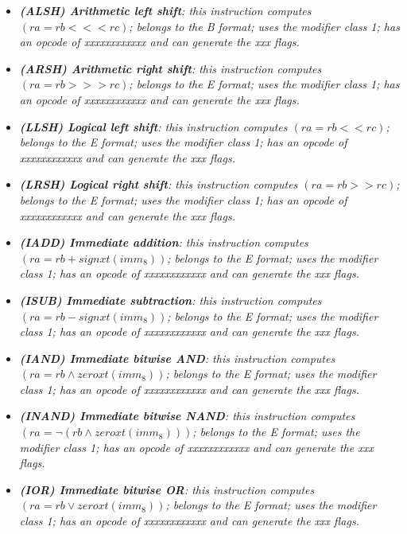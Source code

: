 \begin{multicols}{2}
\begin{itemize}
                \item \textit{\textbf{(ALSH) Arithmetic left shift}: this instruction computes \((ra = rb <<< rc)\); belongs to the B format; uses the modifier class 1; has an opcode of xxxxxxxxxxxx and can generate the xxx flags.}

                \item \textit{\textbf{(ARSH) Arithmetic right shift}: this instruction computes \((ra = rb >>> rc)\); belongs to the E format; uses the modifier class 1; has an opcode of xxxxxxxxxxxx and can generate the xxx flags.}

                \item \textit{\textbf{(LLSH) Logical left shift}: this instruction computes \((ra = rb << rc)\); belongs to the E format; uses the modifier class 1; has an opcode of xxxxxxxxxxxx and can generate the xxx flags.}

                \item \textit{\textbf{(LRSH) Logical right shift}: this instruction computes \((ra = rb >> rc)\); belongs to the E format; uses the modifier class 1; has an opcode of xxxxxxxxxxxx and can generate the xxx flags.}

                \item \textit{\textbf{(IADD) Immediate addition}: this instruction computes \((ra = rb + signxt(imm_8))\); belongs to the E format; uses the modifier class 1; has an opcode of xxxxxxxxxxxx and can generate the xxx flags.}

                \item \textit{\textbf{(ISUB) Immediate subtraction}: this instruction computes \((ra = rb - signxt(imm_8))\); belongs to the E format; uses the modifier class 1; has an opcode of xxxxxxxxxxxx and can generate the xxx flags.}

                \item \textit{\textbf{(IAND) Immediate bitwise AND}: this instruction computes \((ra = rb \wedge zeroxt(imm_8))\); belongs to the E format; uses the modifier class 1; has an opcode of xxxxxxxxxxxx and can generate the xxx flags.}

                \item \textit{\textbf{(INAND) Immediate bitwise NAND}: this instruction computes \((ra = \neg(rb \wedge zeroxt(imm_8)))\); belongs to the E format; uses the modifier class 1; has an opcode of xxxxxxxxxxxx and can generate the xxx flags.}

                \item \textit{\textbf{(IOR) Immediate bitwise OR}: this instruction computes \((ra = rb \vee zeroxt(imm_8))\); belongs to the E format; uses the modifier class 1; has an opcode of xxxxxxxxxxxx and can generate the xxx flags.}


\end{itemize}
\end{multicols}
